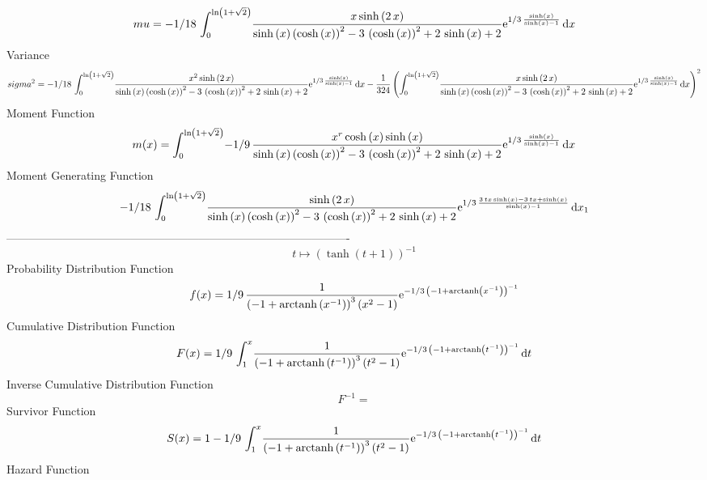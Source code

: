 \documentclass[12pt]{article}
\begin{document}
 $$ mu=-1/18\,\int_{0}^{\ln  \left( 1+\sqrt {2} \right) }\!{\frac {x\sinh
 \left( 2\,x \right) }{\sinh \left( x \right)  \left( \cosh \left( x
 \right)  \right) ^{2}-3\, \left( \cosh \left( x \right)  \right) ^{2}
+2\,\sinh \left( x \right) +2}{{\rm e}^{1/3\,{\frac {\sinh \left( x
 \right) }{\sinh \left( x \right) -1}}}}}\,{\rm d}x
$$ Variance 
 $$ sigma^2 = -1/18\,\int_{0}^{\ln  \left( 1+\sqrt {2} \right) }\!{\frac {{x}^{2}
\sinh \left( 2\,x \right) }{\sinh \left( x \right)  \left( \cosh
 \left( x \right)  \right) ^{2}-3\, \left( \cosh \left( x \right) 
 \right) ^{2}+2\,\sinh \left( x \right) +2}{{\rm e}^{1/3\,{\frac {
\sinh \left( x \right) }{\sinh \left( x \right) -1}}}}}\,{\rm d}x-{
\frac {1}{324} \left( \int_{0}^{\ln  \left( 1+\sqrt {2} \right) }\!{
\frac {x\sinh \left( 2\,x \right) }{\sinh \left( x \right)  \left( 
\cosh \left( x \right)  \right) ^{2}-3\, \left( \cosh \left( x
 \right)  \right) ^{2}+2\,\sinh \left( x \right) +2}{{\rm e}^{1/3\,{
\frac {\sinh \left( x \right) }{\sinh \left( x \right) -1}}}}}
\,{\rm d}x \right) ^{2}}
$$Moment Function 
 $$ m(x) = \int_{0}^{\ln  \left( 1+\sqrt {2} \right) }\!-1/9\,{\frac {{x}^{r}
\cosh \left( x \right) \sinh \left( x \right) }{\sinh \left( x
 \right)  \left( \cosh \left( x \right)  \right) ^{2}-3\, \left( \cosh
 \left( x \right)  \right) ^{2}+2\,\sinh \left( x \right) +2}{{\rm e}^
{1/3\,{\frac {\sinh \left( x \right) }{\sinh \left( x \right) -1}}}}}
\,{\rm d}x
$$ Moment Generating Function 
 $$-1/18\,\int_{0}^{\ln  \left( 1+\sqrt {2} \right) }\!{\frac {\sinh
 \left( 2\,x \right) }{\sinh \left( x \right)  \left( \cosh \left( x
 \right)  \right) ^{2}-3\, \left( \cosh \left( x \right)  \right) ^{2}
+2\,\sinh \left( x \right) +2}{{\rm e}^{1/3\,{\frac {3\,tx\sinh
 \left( x \right) -3\,tx+\sinh \left( x \right) }{\sinh \left( x
 \right) -1}}}}}\,{\rm d}x_{{1}}
$$-------------------------------------------------------------------------------------------  \\$$t\mapsto  \left( \tanh \left( t+1 \right)  \right) ^{-1}
$$Probability Distribution Function 
$$  f(x)=1/9\,{\frac {1}{ \left( -1+{\rm arctanh} \left({x}^{-1}\right)
 \right) ^{3} \left( {x}^{2}-1 \right) }{{\rm e}^{-1/3\, \left( -1+
{\rm arctanh} \left({x}^{-1}\right) \right) ^{-1}}}}
$$Cumulative Distribution Function  
 $$F(x)=1/9\,\int_{1}^{x}\!{\frac {1}{ \left( -1+{\rm arctanh} \left({t}^{-1}
\right) \right) ^{3} \left( {t}^{2}-1 \right) }{{\rm e}^{-1/3\,
 \left( -1+{\rm arctanh} \left({t}^{-1}\right) \right) ^{-1}}}}
\,{\rm d}t
$$ Inverse Cumulative Distribution Function 
  $$F^{-1} = $$Survivor Function 
 $$ S(x)=1-1/9\,\int_{1}^{x}\!{\frac {1}{ \left( -1+{\rm arctanh} \left({t}^{-1
}\right) \right) ^{3} \left( {t}^{2}-1 \right) }{{\rm e}^{-1/3\,
 \left( -1+{\rm arctanh} \left({t}^{-1}\right) \right) ^{-1}}}}
\,{\rm d}t
$$ Hazard Function 
\end{document}
